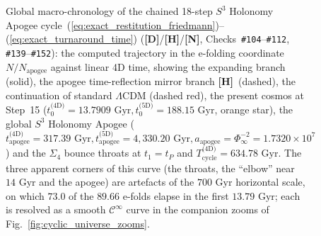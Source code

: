 \documentclass[11pt,a4paper]{article}
\newcommand{\catD}{\textbf{\textcolor{blue!75!black}{[D]}}}
\newcommand{\catH}{\textbf{\textcolor{orange!85!black}{[H]}}}
\newcommand{\catN}{\textbf{\textcolor{teal!75!black}{[N]}}}
\theoremstyle{plain}
\theoremstyle{definition}
\theoremstyle{remark}
\numberwithin{equation}{section}
\begin{document}
\begin{figure}[H]
\begin{tikzpicture}
\end{tikzpicture}
\caption{Global macro-chronology of the chained 18-step $S^3$ Holonomy Apogee cycle~(\ref{eq:exact_restitution_friedmann})--(\ref{eq:exact_turnaround_time}) (\catD/\catH/\catN, Checks~\texttt{\#104}--\texttt{\#112}, \texttt{\#139}--\texttt{\#152}): the computed trajectory in the e-folding coordinate $N/N_{\text{apogee}}$ against linear 4D time, showing the expanding branch (solid), the apogee time-reflection mirror branch \catH\ (dashed), the continuation of standard $\Lambda\text{CDM}$ (dashed red), the present cosmos at Step~15 ($t_0^{\text{(4D)}} = 13.7909\text{ Gyr}, t_0^{\text{(5D)}} = 188.15\text{ Gyr}$, orange star), the global $S^3$ Holonomy Apogee ($t_{\text{apogee}}^{\text{(4D)}} = 317.39\text{ Gyr}, t_{\text{apogee}}^{\text{(5D)}} = 4{,}330.20\text{ Gyr}, a_{\text{apogee}} = \Phi_{\infty}^{-2} = 1.7320 \times 10^7$) and the $\Sigma_4$ bounce throats at $t_1 = t_P$ and $T_{\text{cycle}}^{\text{(4D)}} = 634.78\text{ Gyr}$. The three apparent corners of this curve (the throats, the ``elbow'' near $14\text{ Gyr}$ and the apogee) are artefacts of the $700\text{ Gyr}$ horizontal scale, on which $73.0$ of the $89.66$ e-folds elapse in the first $13.79\text{ Gyr}$; each is resolved as a smooth $\mathcal{C}^{\infty}$ curve in the companion zooms of Fig.~\ref{fig:cyclic_universe_zooms}.}
\label{fig:cyclic_universe_trajectory}
\end{figure}
\end{document}

